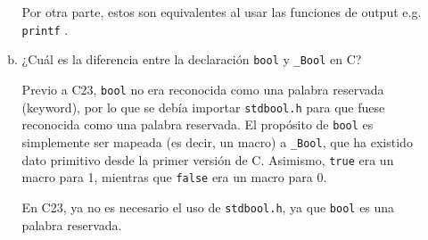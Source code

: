 \documentclass{article}
\begin{document}
\begin{enumerate}
\begin{enumerate}[(a)]
\begin{mdframed}[
				linecolor=darkgray,
				backgroundcolor=pearl]
				Por otra parte, estos son equivalentes al usar las funciones de output e.g. \texttt{printf} \cite{cppreference:fprintf, cppreference:vfprintf}.
			\end{mdframed}
			\vspace{12pt}
			\item ¿Cuál es la diferencia entre la declaración \texttt{bool} y \texttt{\_Bool} en C?
			\begin{mdframed}[
				linecolor=darkgray,
				backgroundcolor=pearl]
				Previo a C23, \texttt{bool} no era reconocida como una palabra reservada (keyword), por lo que se deb\'ia importar \texttt{stdbool.h} para que fuese reconocida como una palabra reservada. El prop\'osito de \texttt{bool} es simplemente ser mapeada (es decir, un macro) a \texttt{\_Bool}, que ha existido dato primitivo desde la primer versi\'on de C. Asimismo, \texttt{true} era un macro para 1, mientras que \texttt{false} era un macro para 0.
				
				En C23, ya no es necesario el uso de \texttt{stdbool.h}, ya que \texttt{bool} es una palabra reservada. \cite{cppreference:arithmetic_types}
			\end{mdframed}
		\end{enumerate}
	
		\vspace{12pt}
	

\end{enumerate}
\end{document}
